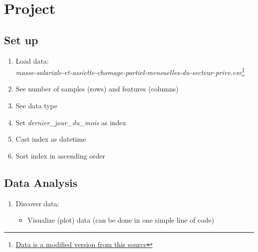 
\setcounter{section}{0}


\section{Project}


\subsection{Set up}

\begin{enumerate}
    \item Load data:\\
    \textit{masse-salariale-et-assiette-chomage-partiel-mensuelles-du-secteur-prive.csv}\footnote{\href{https://www.data.gouv.fr/fr/datasets/masse-salariale-et-assiette-chomage-partiel-mensuelles-du-secteur-prive/}{Data is a modified version from this source}}
    \item See number of samples (rows) and features (columns)
    \item See data type
    \item Set \textit{dernier\_jour\_du\_mois} as index
    \item Cast index as datetime
    \item Sort index in ascending order
\end{enumerate}


\subsection{Data Analysis}

\begin{enumerate}
    \item Discover data:
    \begin{itemize}
        \item Visualize (plot) data (can be done in one simple line of code)
    \end{itemize}
\end{enumerate}


